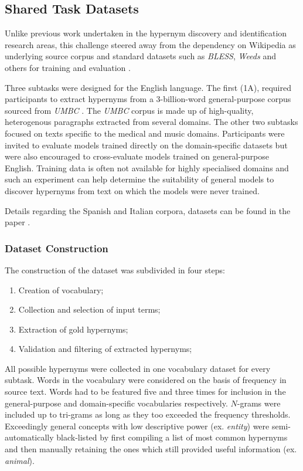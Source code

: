 \subsection{Shared Task Datasets}
Unlike previous work undertaken in the hypernym discovery and identification research areas, this challenge steered away from the dependency on Wikipedia as underlying source corpus \citep{espinosa2016supervised, shwartz2016path, shwartz2017siege} and 
standard datasets such as \textit{BLESS}, \textit{Weeds} and others for training and evaluation \citep{ustalov2017negative, yamane2016distributional, shwartz2016path}.  

Three subtasks were designed for the English language.  The first (1A), required participants to extract hypernyms from a 3-billion-word general-purpose corpus sourced from \textit{UMBC} \citep{han2013umbc_ebiquity}.  The \textit{UMBC} corpus is made up of high-quality, heterogenous paragraphs extracted from several domains.  The other two subtasks focused on texts specific to the medical and music domains.  Participants were invited to evaluate  models trained directly on the domain-specific datasets but were also encouraged to cross-evaluate models trained on general-purpose English.  Training data is often not available for highly specialised domains and such an experiment can help determine the suitability of general models to discover hypernyms from text on which the models were never trained.

Details regarding the Spanish and Italian corpora, datasets can be found in the paper \citep{camacho2018semeval}.

\subsubsection{Dataset Construction}
The construction of the dataset was subdivided in four steps:
\begin{enumerate}
    \item Creation of vocabulary;
    \item Collection and selection of input terms;
    \item Extraction of gold hypernyms;
    \item Validation and filtering of extracted hypernyms;
\end{enumerate}
All possible hypernyms were collected in one vocabulary dataset for every subtask.  Words in the vocabulary were considered on the basis of frequency in source text.  Words had to be featured five and three times for inclusion in the general-purpose and domain-specific vocabularies respectively.  $N$-grams were included up to tri-grams as long as they too exceeded the frequency thresholds.  Exceedingly general concepts with low descriptive power (ex. \textit{entity}) were semi-automatically black-listed by first compiling a list of most common hypernyms and then manually retaining the ones which still provided useful information (ex. \textit{animal}).

